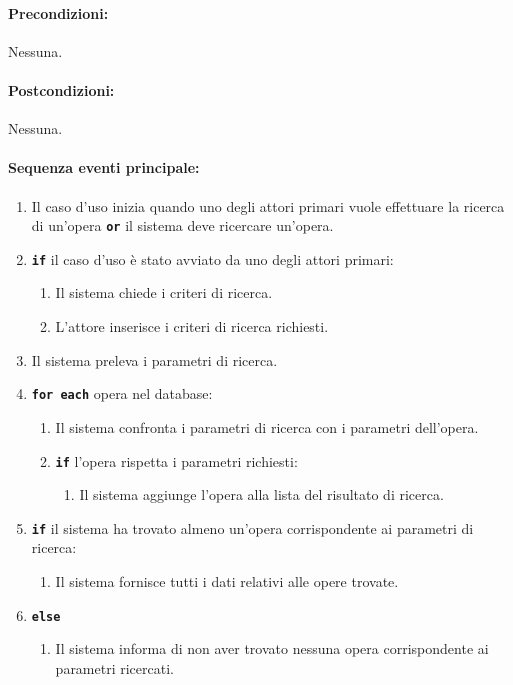 \documentclass{article}
\begin{document}
	\paragraph{Precondizioni:}Nessuna.
	
	\paragraph{Postcondizioni:}Nessuna.
	
	\paragraph{Sequenza eventi principale:}

		\begin{enumerate}[itemsep=8pt,parsep=0pt]
		
		\item Il caso d’uso inizia quando uno degli attori primari vuole effettuare la ricerca di un'opera \texttt{\textbf{or}} il sistema deve ricercare un'opera.

		\item \texttt{\textbf{if}} il caso d'uso è stato avviato da uno degli attori primari:
			\begin{enumerate}	[leftmargin=28pt]
				\item Il sistema chiede i criteri di ricerca.
				\item L'attore inserisce i criteri di ricerca richiesti.
  			\end{enumerate}	

		\item Il sistema preleva i parametri di ricerca.
		
		\item \texttt{\textbf{for each}} opera nel database:
		\begin{enumerate}	[leftmargin=28pt]
		    \item Il sistema confronta i parametri di ricerca con i parametri dell'opera.
            \item \texttt{\textbf{if}} l'opera rispetta i parametri richiesti:
			 \begin{enumerate}	[leftmargin=28pt]
				\item Il sistema aggiunge l'opera alla lista del risultato di ricerca.
			\end{enumerate}
		\end{enumerate}
		\item \texttt{\textbf{if}} il sistema ha trovato almeno un'opera corrispondente ai parametri di ricerca:
		\begin{enumerate}	[leftmargin=28pt]
			\item  Il sistema fornisce tutti i dati relativi alle opere trovate.
		\end{enumerate}
		\item \texttt{\textbf{else}}
		\begin{enumerate}	[leftmargin=28pt]
				\item  Il sistema informa di non aver trovato nessuna opera corrispondente ai parametri ricercati.
		\end{enumerate}
	\end{enumerate}
	
\end{document}
